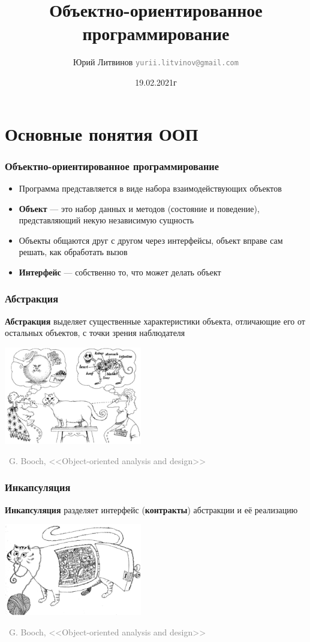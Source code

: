 \documentclass[xetex,mathserif,serif]{beamer}
\title{Объектно-ориентированное программирование}
\author[Юрий Литвинов]{Юрий Литвинов \newline \textcolor{gray}{\small\texttt{yurii.litvinov@gmail.com}}}
\date{19.02.2021г}
\newcommand{\attribution}[1] {
    \begin{flushright}\begin{scriptsize}\textcolor{gray}{\textcopyright\, #1}\end{scriptsize}\end{flushright}
}
\begin{document}
    
    \frame{\titlepage}

    \section{Основные понятия ООП}

    \begin{frame}
        \frametitle{Объектно-ориентированное программирование}
        \begin{itemize}
            \item Программа представляется в виде набора взаимодействующих объектов
            \item \textbf{Объект} --- это набор данных и методов (состояние и поведение), представляющий некую независимую сущность
            \item Объекты общаются друг с другом через интерфейсы, объект вправе сам решать, как обработать вызов
            \item \textbf{Интерфейс} --- собственно то, что может делать объект
        \end{itemize}
    \end{frame}

    \begin{frame}
        \frametitle{Абстракция}
        \textbf{Абстракция} выделяет существенные характеристики объекта, отличающие его от остальных объектов, с точки зрения наблюдателя
        \vskip 1cm
        \begin{center}
            \includegraphics[width=0.45\textwidth]{abstraction.png}
        \end{center}
        \attribution{G. Booch, <<Object-oriented analysis and design>>}
    \end{frame}

    \begin{frame}
        \frametitle{Инкапсуляция}
        \textbf{Инкапсуляция} разделяет интерфейс (\textbf{контракты}) абстракции и её реализацию

        \vskip 1cm
        \begin{center}
            \includegraphics[width=0.45\textwidth]{incapsulation.png}
        \end{center}
        \attribution{G. Booch, <<Object-oriented analysis and design>>}
    \end{frame}
\end{document}
